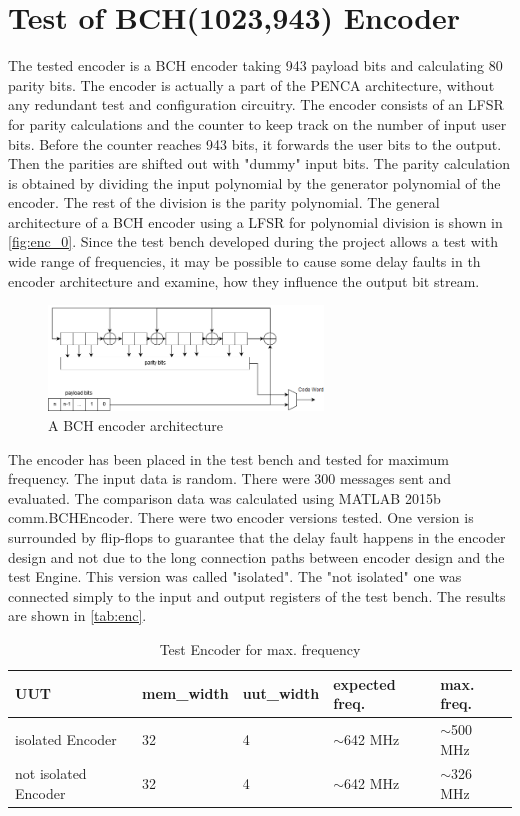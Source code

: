 \section{Test of BCH(1023,943) Encoder}
The tested encoder is a BCH encoder taking 943 payload bits and calculating 80 parity bits. The encoder is actually a part of the PENCA architecture, without any redundant test and configuration circuitry. The encoder consists of an LFSR for parity calculations and the counter to keep track on the number of input user bits. Before the counter reaches 943 bits, it forwards the user bits to the output. Then the parities are shifted out with "dummy" input bits. The parity calculation is obtained by dividing the input polynomial by the generator polynomial of the encoder. The rest of the division is the parity polynomial. The general architecture of a BCH encoder using a LFSR for polynomial division is shown in \autoref{fig:enc_0}. Since the test bench developed during the project allows a test with wide range of frequencies, it may be possible to cause some delay faults in th encoder architecture and examine, how they influence the output bit stream.

\begin{figure}[h]
\centering
\includegraphics[width=0.65\textwidth]{figures/BCH_ENC.png}
\caption{A BCH encoder architecture \cite{art:BCH_implement}}
\label{fig:enc_1}
\end{figure}

The encoder has been placed in the test bench and tested for maximum frequency. The input data is random. There were 300 messages sent and evaluated. The comparison data was calculated using MATLAB 2015b comm.BCHEncoder. There were two encoder versions tested. One version is surrounded by flip-flops to guarantee that the delay fault happens in the encoder design and not due to the long connection paths between encoder design and the test Engine. This version was called "isolated". The "not isolated" one was connected simply to the input and output registers of the test bench. The results are shown in \autoref{tab:enc}.

\begin{table}[h]
\begin{tabular}{@{}lllll@{}}
\toprule
UUT                       &mem\_width   &uut\_width &expected freq. &max. freq.\\ 
\midrule
isolated Encoder                  & 32          & 4      & $\sim$642 MHz & $\sim$500 MHz \\
not isolated Encoder              & 32          & 4      & $\sim$642 MHz & $\sim$326 MHz \\
\bottomrule
\end{tabular}
\centering
\caption{Test Encoder for max. frequency}\label{tab:enc}
\end{table}

